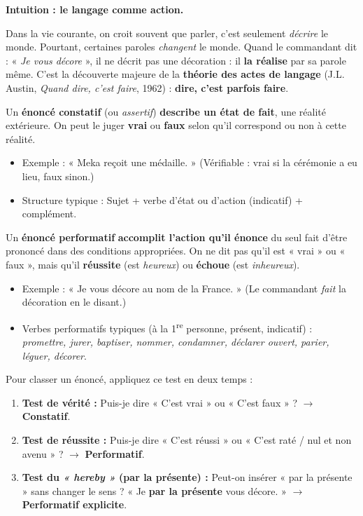 \documentclass[11pt]{article}
\begin{document}
\textbf{Intuition : le langage comme action.}\par
Dans la vie courante, on croit souvent que parler, c'est seulement \emph{décrire} le monde. Pourtant, certaines paroles \emph{changent} le monde. Quand le commandant dit : « \emph{Je vous décore} », il ne décrit pas une décoration : il \textbf{la réalise} par sa parole même. C'est la découverte majeure de la \textbf{théorie des actes de langage} (J.L. Austin, \emph{Quand dire, c'est faire}, 1962) : \textbf{dire, c'est parfois faire}.

\begin{definition}
Un \textbf{énoncé constatif} (ou \emph{assertif}) \textbf{describe un état de fait}, une réalité extérieure. On peut le juger \textbf{vrai} ou \textbf{faux} selon qu'il correspond ou non à cette réalité.
\begin{itemize}
    \item Exemple : « Meka reçoit une médaille. » (Vérifiable : vrai si la cérémonie a eu lieu, faux sinon.)
    \item Structure typique : Sujet + verbe d'état ou d'action (indicatif) + complément.
\end{itemize}
\end{definition}

\begin{definition}
Un \textbf{énoncé performatif} \textbf{accomplit l'action qu'il énonce} du seul fait d'être prononcé dans des conditions appropriées. On ne dit pas qu'il est « vrai » ou « faux », mais qu'il \textbf{réussite} (est \emph{heureux}) ou \textbf{échoue} (est \emph{inheureux}).
\begin{itemize}
    \item Exemple : « Je vous décore au nom de la France. » (Le commandant \emph{fait} la décoration en le disant.)
    \item Verbes performatifs typiques (à la 1\textsuperscript{re} personne, présent, indicatif) : \emph{promettre, jurer, baptiser, nommer, condamner, déclarer ouvert, parier, léguer, décorer}.
\end{itemize}
\end{definition}

\begin{methode}
Pour classer un énoncé, appliquez ce test en deux temps :
\begin{enumerate}
    \item \textbf{Test de vérité :} Puis-je dire « C'est vrai » ou « C'est faux » ? $\rightarrow$ \textbf{Constatif}.
    \item \textbf{Test de réussite :} Puis-je dire « C'est réussi » ou « C'est raté / nul et non avenu » ? $\rightarrow$ \textbf{Performatif}.
    \item \textbf{Test du \emph{« hereby »} (par la présente) :} Peut-on insérer « par la présente » sans changer le sens ? « Je \textbf{par la présente} vous décore. » $\rightarrow$ \textbf{Performatif explicite}.
\end{enumerate}
\end{methode}
\end{document}

